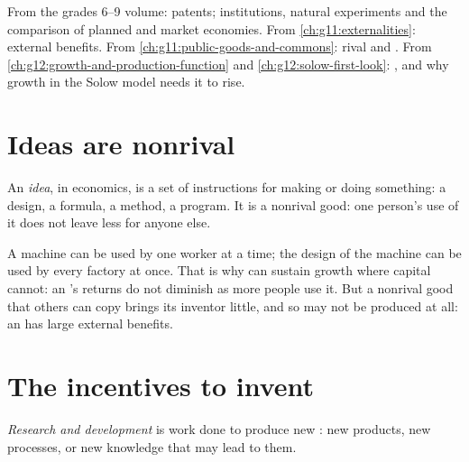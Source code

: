 \begin{recall}
From the grades 6--9 volume: patents; institutions, natural experiments and the comparison of planned and market economies. From \cref{ch:g11:externalities}: external
benefits. From \cref{ch:g11:public-goods-and-commons}: rival and . From \cref{ch:g12:growth-and-production-function} and \cref{ch:g12:solow-first-look}: , and why growth in the Solow model needs it to rise.
\end{recall}

\section{Ideas are nonrival}\label{sec:g12:ideas-institutions-growth:ideas}

\begin{definition}[Idea]\label{def:g12:ideas-institutions-growth:idea}
An \emph{idea}, in economics, is a set of instructions for making or doing something: a design, a formula, a method, a program. It is a nonrival good: one
person's use of it does not leave less for anyone else.
\end{definition}

A machine can be used by one worker at a time; the design of the machine can be used by every factory at once. That is why  can sustain growth where capital cannot:
an 's returns do not diminish as more people use it. But a nonrival good that others can copy brings its inventor little, and so may not be produced at all: an 
has large external benefits.

\section{The incentives to invent}\label{sec:g12:ideas-institutions-growth:incentives}

\begin{definition}\label{def:g12:ideas-institutions-growth:rnd}
\emph{Research and development} is work done to produce new : new products, new processes, or new knowledge that may lead to them.
\end{definition}

